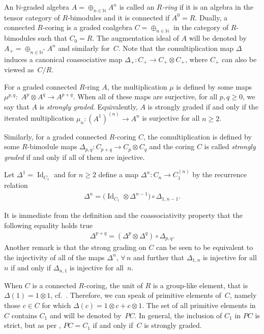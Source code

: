 \documentclass[pdftex]{sigma}
\newcommand\ot{\otimes}
\newcommand\op{\oplus}
\newcommand\bb{\mathbb}
\renewcommand{\^}[1]{\mbox{$^{\left( #1 \right)}$}}
\renewcommand{\_}[1]{\mbox{$_{\left( #1 \right)}$}}
\numberwithin{equation}{section}
\begin{document}
An $\bb{N}$-graded algebra $A = \op_{n \in \bb{N}} A^n$ is called an \emph{$R$-ring} if it is an algebra in the tensor category of $R$-bimodules and it is connected if $A^0=R$. Dually, a connected $R$-coring is a graded coalgebra $C = \op_{n \in \bb{N}}$ in the category of $R$-bimodules such that $C_0=R$. The augmentation ideal of $A$ will be denoted by $A_+ = \op_{n \in \bb{N}^\ast} A^n$ and similarly for~$C$. Note that the comultiplication map $\Delta$ induces a canonical coassociative map $\Delta_+ \colon C_+ \to C_+ \ot C_+$, where $C_+$ can also be viewed as~$C/R$.

For a graded connected $R$-ring $A$, the multiplication $\mu$ is def\/ined by some maps $\mu^{p,q} \colon$ \mbox{$A^p \ot A^q \to A^{p+q}$}. When all of these maps are surjective, for all $p,q \geq 0$, we say that $A$ is \emph{strongly graded}. Equivalently, $A$ is strongly graded if and only if the iterated multiplication $\mu_n \colon (A^1)^{(n)} \to A^n$ is surjective for all $n \geq 2$.

Similarly, for a graded connected $R$-coring $C$, the comultiplication is def\/ined by some $R$-bimodule maps $\Delta_{p,q} \colon C_{p+q} \to C_p \ot C_q$ and the coring $C$ is called \emph{strongly graded} if and only if all of them are injective.

Let $\Delta^1 = \operatorname{Id}_{C_1}$ and for $n \geq 2$ def\/ine a map $\Delta^n\colon C_n \to C_1^{(n)}$ by the recurrence relation
\begin{gather*}
	\Delta^n = \big(\operatorname{Id}_{C_1} \ot \Delta^{n-1}\big) \circ \Delta_{1,n-1}.
\end{gather*}

It is immediate from the def\/inition and the coassociativity property that the following equality holds true
\begin{gather*}
	\Delta^{p+q} = (\Delta^p \ot \Delta^q) \circ \Delta_{p,q}.
\end{gather*}
Another remark is that the strong grading on $C$ can be seen to be equivalent to the injectivity of all of the maps $\Delta^n$, $\forall\, n$ and further that $\Delta_{1,n}$ is injective for all $n$ if and only if $\Delta_{n,1}$ is injective for all~$n$.

When $C$ is a connected $R$-coring, the unit of $R$ is a group-like element, that is $\Delta(1) = 1 \ot 1$, cf.~\cite{jps}. Therefore, we can speak of primitive elements of~$C$, namely those $c \in C$ for which $\Delta(c) = 1 \ot c + c \ot 1$. The set of all primitive elements in $C$ contains $C_1$ and will be denoted by~$PC$. In general, the inclusion of $C_1$ in $PC$ is strict, but as per \cite[Lemma~1.4]{mst}, $PC = C_1$ if and only if~$C$ is strongly graded.
\end{document}
